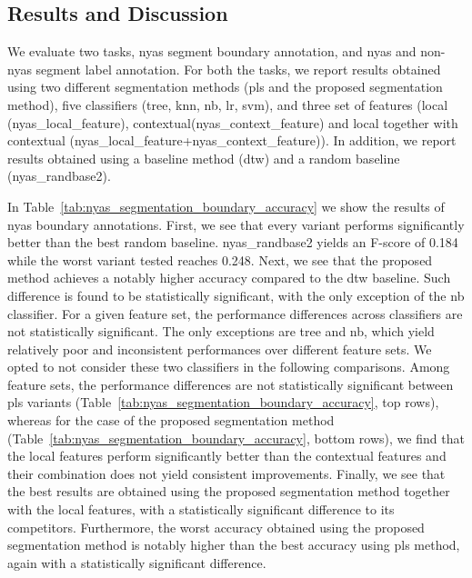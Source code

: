 {\subsection{Results and Discussion}
\label{sec:preprocessing_nyas_segmentation_results_and_discussion}

We evaluate two tasks, \gls{nyas} segment boundary annotation, and \gls{nyas} and non-\gls{nyas} segment label annotation. For both the tasks, we report results obtained using two different segmentation methods (\gls{pls} and the proposed segmentation method), five classifiers (\acrshort{tree}, \gls{knn}, \gls{nb}, \gls{lr}, \gls{svm}), and three set of features (local (\acrshort{nyas_local_feature}), contextual(\acrshort{nyas_context_feature}) and local together with contextual (\acrshort{nyas_local_feature}+\acrshort{nyas_context_feature})). In addition, we report results obtained using a baseline method (\acrshort{dtw}) and a random baseline (\acrshort{nyas_randbase2}).

In Table~\ref{tab:nyas_segmentation_boundary_accuracy} we show the results of \gls{nyas} boundary annotations. First, we see that every variant performs significantly better than the best random baseline. \acrshort{nyas_randbase2} yields an F-score of 0.184 while the worst variant tested reaches 0.248. Next, we see that the proposed method achieves a notably higher accuracy compared to the \acrshort{dtw} baseline. Such difference is found to be statistically significant, with the only exception of the \acrshort{nb} classifier. For a given feature set, the performance differences across classifiers are not statistically significant. The only exceptions are \acrshort{tree} and \acrshort{nb}, which yield relatively poor and inconsistent performances over different feature sets. We opted to not consider these two classifiers in the following comparisons. Among  feature sets, the performance differences are not statistically significant between \gls{pls} variants (Table~\ref{tab:nyas_segmentation_boundary_accuracy}, top rows), whereas for the case of the proposed segmentation method (Table~\ref{tab:nyas_segmentation_boundary_accuracy}, bottom rows), we find that the local features perform significantly better than the contextual features and their combination does not yield consistent improvements. Finally, we see that the best results are obtained using the proposed segmentation method together with the local features, with a statistically significant difference to its competitors. Furthermore, the worst accuracy obtained using the proposed segmentation method is notably higher than the best accuracy using \gls{pls} method, again with a statistically significant difference.

}
